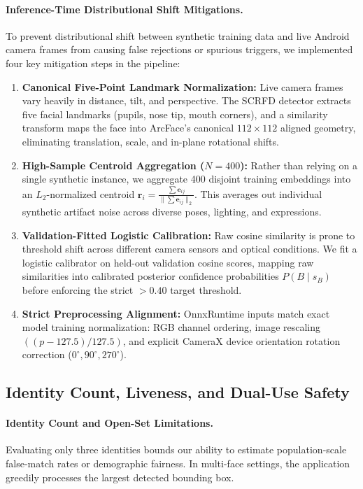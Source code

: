\documentclass{article}
\begin{document}
\paragraph{Inference-Time Distributional Shift Mitigations.}
To prevent distributional shift between synthetic training data and live Android camera frames from causing false rejections or spurious triggers, we implemented four key mitigation steps in the pipeline:
\begin{enumerate}
    \item \textbf{Canonical Five-Point Landmark Normalization:} Live camera frames vary heavily in distance, tilt, and perspective. The SCRFD detector extracts five facial landmarks (pupils, nose tip, mouth corners), and a similarity transform maps the face into ArcFace's canonical $112\times112$ aligned geometry, eliminating translation, scale, and in-plane rotational shifts.
    \item \textbf{High-Sample Centroid Aggregation ($N=400$):} Rather than relying on a single synthetic instance, we aggregate 400 disjoint training embeddings into an $L_2$-normalized centroid $\mathbf{r}_i = \frac{\sum \mathbf{e}_{ij}}{\|\sum \mathbf{e}_{ij}\|_2}$. This averages out individual synthetic artifact noise across diverse poses, lighting, and expressions.
    \item \textbf{Validation-Fitted Logistic Calibration:} Raw cosine similarity is prone to threshold shift across different camera sensors and optical conditions. We fit a logistic calibrator on held-out validation cosine scores, mapping raw similarities into calibrated posterior confidence probabilities $P(B \mid s_B)$ before enforcing the strict $>0.40$ target threshold.
    \item \textbf{Strict Preprocessing Alignment:} OnnxRuntime inputs match exact model training normalization: RGB channel ordering, image rescaling $((p - 127.5)/127.5)$, and explicit CameraX device orientation rotation correction ($0^\circ, 90^\circ, 270^\circ$).
\end{enumerate}

\subsection{Identity Count, Liveness, and Dual-Use Safety}
\paragraph{Identity Count and Open-Set Limitations.} Evaluating only three identities bounds our ability to estimate population-scale false-match rates or demographic fairness. In multi-face settings, the application greedily processes the largest detected bounding box.
\end{document}
